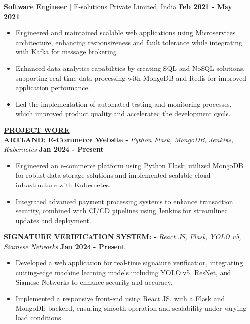 \documentclass{article}
\begin{document}
\noindent \textbf{Software Engineer | } E-solutions Private Limited, India  \hfill \textbf{Feb 2021 - May 2021}
\begin{itemize}[noitemsep,nolistsep,leftmargin=*]
\item {\small Engineered and maintained scalable web applications using Microservices architecture, enhancing responsiveness and fault tolerance while integrating with Kafka for message brokering.}
\item {\small Enhanced data analytics capabilities by creating SQL and NoSQL solutions, supporting real-time data processing with MongoDB and Redis for improved application performance.}
\item {\small Led the implementation of automated testing and monitoring processes, which improved product quality and accelerated the development cycle.}\\
\end{itemize}

\noindent \textbf{\underline{}} 
\noindent \textbf{\underline{PROJECT WORK}} \\
\noindent \textbf{ARTLAND: E-Commerce Website -} \textit{Python Flask, MongoDB, Jenkins, Kubernetes} \hfill \textbf{Jan 2024 - Present}
\begin{itemize}[noitemsep,nolistsep,leftmargin=*]
\item {\small Engineered an e-commerce platform using Python Flask; utilized MongoDB for robust data storage solutions and implemented scalable cloud infrastructure with Kubernetes.}
\item {\small Integrated advanced payment processing systems to enhance transaction security, combined with CI/CD pipelines using Jenkins for streamlined updates and deployment.}
\end{itemize}

\noindent \textbf{SIGNATURE VERIFICATION SYSTEM: -} \textit{React JS, Flask, YOLO v5, Siamese Networks} \hfill \textbf{Jan 2024 - Present}
\begin{itemize}[noitemsep,nolistsep,leftmargin=*]
\item {\small Developed a web application for real-time signature verification, integrating cutting-edge machine learning models including YOLO v5, ResNet, and Siamese Networks to enhance security and accuracy.}
\item {\small Implemented a responsive front-end using React JS, with a Flask and MongoDB backend, ensuring smooth operation and scalability under varying load conditions.}
\end{itemize}
\end{document}

